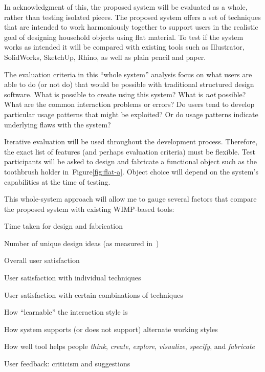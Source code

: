 \documentclass[12pt]{article}
\newenvironment{packed_enum}{
\begin{enumerate}
  \setlength{\itemsep}{1pt}
  \setlength{\parskip}{0pt}
  \setlength{\parsep}{0pt}
}{\end{enumerate}}
\begin{document}
In acknowledgment of this, the proposed system will be evaluated as a
whole, rather than testing isolated pieces. The proposed system offers
a set of techniques that are intended to work harmoniously together to
support users in the realistic goal of designing household objects
using flat material. To test if the system works as intended it will
be compared with existing tools such as Illustrator, SolidWorks,
SketchUp, Rhino, as well as plain pencil and paper. 

The evaluation criteria in this ``whole system'' analysis focus on
what users are able to do (or not do) that would be possible with
traditional structured design software. What is possible to create
using this system? What is \textit{not} possible? What are the common
interaction problems or errors? Do users tend to develop particular
usage patterns that might be exploited? Or do usage patterns indicate
underlying flaws with the system?

Iterative evaluation will be used throughout the development
process. Therefore, the exact list of features (and perhaps evaluation
criteria) must be flexible. Test participants will be asked to design
and fabricate a functional object such as the toothbrush holder
in~Figure\ref{fig:flat-a}. Object choice will depend on the system's
capabilities at the time of testing.

This whole-system approach will allow me to gauge several factors that
compare the proposed system with existing WIMP-based tools:

\begin{packed_enum}
\item Time taken for design and fabrication
\item Number of unique design ideas (as measured
  in~\cite{goel-sketches-of-thought})
\item Overall user satisfaction
\item User satisfaction with individual techniques
\item User satisfaction with certain combinations of techniques
\item How ``learnable'' the interaction style is
\item How system supports (or does not support) alternate working
  styles
\item How well tool helps people \textit{think}, \textit{create},
  \textit{explore}, \textit{visualize}, \textit{specify}, and
  \textit{fabricate}
\item User feedback: criticism and suggestions
\end{packed_enum}
\end{document}
